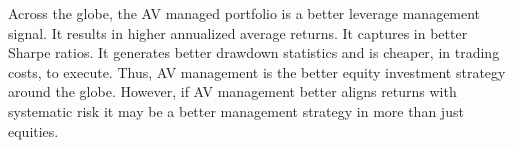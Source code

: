 %
%


%

Across the globe, the AV managed portfolio is a better leverage management signal. It results in higher annualized average returns. It captures in better Sharpe ratios. It generates better drawdown statistics and is cheaper, in trading costs, to execute. Thus, AV management is the better equity investment strategy around the globe. However, if AV management better aligns returns with systematic risk it may be a better management strategy in more than just equities.